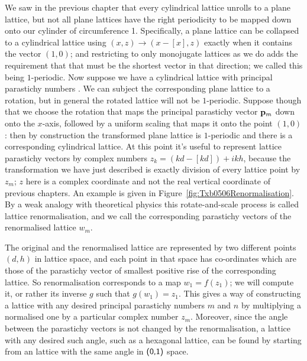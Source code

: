 We saw in the previous chapter that every cylindrical lattice unrolls to a plane lattice, but not all plane lattices have the right periodicity to be mapped down onto our cylinder of circumference 1. Specifically, a plane lattice can be collapsed to a cylindrical lattice using $(x,z)\rightarrow(x-\left[x\right],z)$ exactly when it contains the vector $(1,0)$; and restricting to only monojugate lattices as we do adds the requirement that that must be the shortest vector in that direction; we called this being $1$-periodic. 
Now suppose we have a cylindrical lattice with principal parastichy numbers . We can subject the corresponding plane lattice to a rotation, but in general the rotated lattice will not be $1$-periodic. Suppose though that we choose the rotation that maps the principal parastichy vector ${\mathbf p}_{m}$ down onto the $x$-axis, followed by a uniform scaling that maps it onto the point $(1,0)$: then by construction the transformed plane lattice is $1$-periodic and there is a corresponding cylindrical lattice. At this point it's useful to represent lattice parastichy vectors by complex numbers $z_k=(kd-[kd])+i kh$, because the transformation we have just described is exactly division of every lattice point by $z_m$; $z$ here is a complex coordinate and not the real vertical coordinate of previous chapters. 
 An example is given in Figure~\ref{fig:Txb0506Renormalisation}. By a weak analogy with theoretical physics this rotate-and-scale process is called lattice renormalisation, and we call the corresponding parastichy vectors of the renormalised lattice $w_m$.

The original and the renormalised lattice are represented by two different points $(d,h)$ in lattice space, and each point in that space has co-ordinates which are those of the parastichy vector of smallest positive rise of the corresponding lattice. So renormalisation corresponds to a map $w_1=f(z_1)$; we will compute it, or rather its inverse $g$ such that $g(w_1)=z_1$. This gives a way of constructing a lattice with any desired principal parastichy numbers $m$ and $n$ by multiplying a normalised one by a particular complex number $z_m$. Moreover, since the angle between the parastichy vectors is not changed by the renormalisation, a lattice with any desired such angle, such as a hexagonal lattice, can be found by starting from an lattice with the same angle in $\textsf{(0,1)}$ space. 

